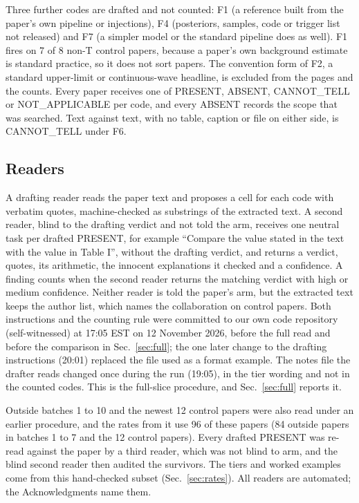 \documentclass[reprint,amsmath,amssymb,aps,superscriptaddress,nofootinbib]{revtex4-2}
\begin{document}
Three further codes are drafted and not counted: F1 (a reference built from the paper's own pipeline or injections), F4 (posteriors, samples, code or trigger list not released) and F7 (a simpler model or the standard pipeline does as well). F1 fires on 7 of 8 non-T control papers, because a paper's own background estimate is standard practice, so it does not sort papers. The convention form of F2, a standard upper-limit or continuous-wave headline, is excluded from the pages and the counts. Every paper receives one of PRESENT, ABSENT, CANNOT\_TELL or NOT\_APPLICABLE per code, and every ABSENT records the scope that was searched. Text against text, with no table, caption or file on either side, is CANNOT\_TELL under F6.

\subsection{Readers}

A drafting reader reads the paper text and proposes a cell for each code with verbatim quotes, machine-checked as substrings of the extracted text. A second reader, blind to the drafting verdict and not told the arm, receives one neutral task per drafted PRESENT, for example ``Compare the value stated in the text with the value in Table I'', without the drafting verdict, and returns a verdict, quotes, its arithmetic, the innocent explanations it checked and a confidence. A finding counts when the second reader returns the matching verdict with high or medium confidence. Neither reader is told the paper's arm, but the extracted text keeps the author list, which names the collaboration on control papers. Both instructions and the counting rule were committed to our own code repository (self-witnessed) at 17:05 EST on 12 November 2026, before the full read and before the comparison in Sec.~\ref{sec:full}; the one later change to the drafting instructions (20:01) replaced the file used as a format example. The notes file the drafter reads changed once during the run (19:05), in the tier wording and not in the counted codes. This is the full-slice procedure, and Sec.~\ref{sec:full} reports it.

Outside batches 1 to 10 and the newest 12 control papers were also read under an earlier procedure, and the rates from it use 96 of these papers (84 outside papers in batches 1 to 7 and the 12 control papers). Every drafted PRESENT was re-read against the paper by a third reader, which was not blind to arm, and the blind second reader then audited the survivors. The tiers and worked examples come from this hand-checked subset (Sec.~\ref{sec:rates}). All readers are automated; the Acknowledgments name them.
\end{document}
